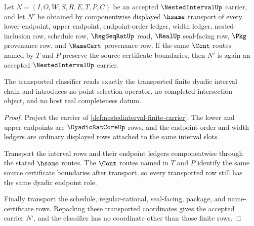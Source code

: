 \begin{theorem}
\label{thm:nestedinterval-endpoint-transport}
Let $N=(I,O,W,S,R,E,T,P,C)$ be an accepted $\NestedIntervalUp$ carrier, and let $N'$ be obtained by componentwise displayed $\hsame$ transport of every lower endpoint, upper endpoint, endpoint-order ledger, width ledger, nested-inclusion row, schedule row, $\RegSeqRatUp$ read, $\RealUp$ seal-facing row, $\Pkg$ provenance row, and $\NameCert$ provenance row. If the same $\Cont$ routes named by $T$ and $P$ preserve the source certificate boundaries, then $N'$ is again an accepted $\NestedIntervalUp$ carrier.

The transported classifier reads exactly the transported finite dyadic interval chain and introduces no point-selection operator, no completed intersection object, and no host real completeness datum.
\end{theorem}
\begin{proof}
Project the carrier of \autoref{def:nestedinterval-finite-carrier}. The lower and upper endpoints are $\DyadicRatCoreUp$ rows, and the endpoint-order and width ledgers are ordinary displayed rows attached to the same interval slots.

Transport the interval rows and their endpoint ledgers componentwise through the stated $\hsame$ routes. The $\Cont$ routes named in $T$ and $P$ identify the same source certificate boundaries after transport, so every transported row still has the same dyadic endpoint role.

Finally transport the schedule, regular-rational, seal-facing, package, and name-certificate rows. Repacking these transported coordinates gives the accepted carrier $N'$, and the classifier has no coordinate other than those finite rows.
\end{proof}

